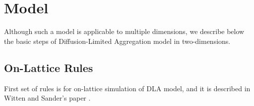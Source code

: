\documentclass[aps,preprint,groupedaddress,letterpaper]{revtex4-1}
\begin{document}

\section{Model}
Although such a model is applicable to multiple dimensions, we describe below the basic steps of Diffusion-Limited Aggregation model in two-dimensions. 

\subsection{On-Lattice Rules}

First set of rules is for on-lattice simulation of DLA model, and it is described in Witten and Sander’s paper \cite{PhysRevB.27.5686}.
\end{document}
